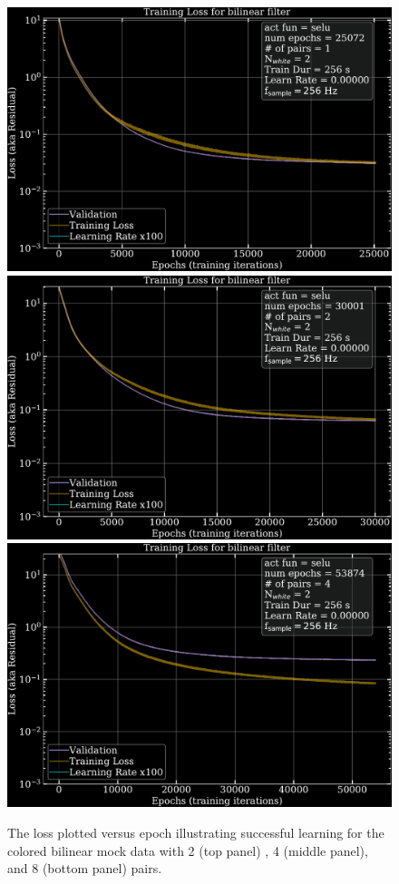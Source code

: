 \begin{refsection}
\begin{figure}[htbp]
   \centering
   \includegraphics[width=.7\columnwidth]{chapter_noise_sub/etc/loss1C}
   \includegraphics[width=.7\columnwidth]{chapter_noise_sub/etc/loss2C}
   \includegraphics[width=.7\columnwidth]{chapter_noise_sub/etc/loss4C}
   \caption{The loss plotted versus epoch illustrating successful learning for the colored bilinear mock data with 2 (top panel) , 4 (middle panel), and 8 (bottom panel) pairs.}
   \label{fig:loss1}
\end{figure}


\end{refsection}
